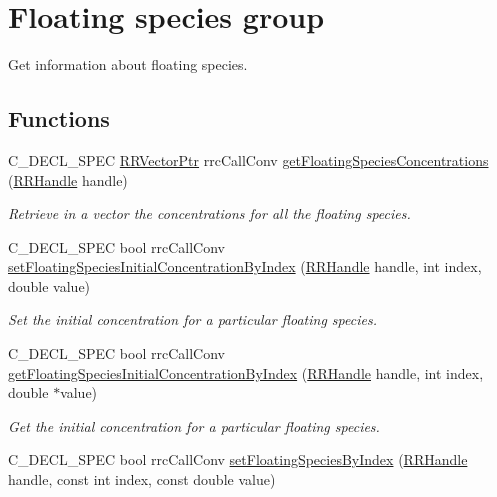 \hypertarget{group__floating}{}\section{Floating species group}
\label{group__floating}


Get information about floating species.  


\subsection*{Functions}
\begin{DoxyCompactItemize}
\item 
C\+\_\+\+D\+E\+C\+L\+\_\+\+S\+P\+E\+C \hyperlink{rrc__types_8h_a3be72d6006034fd349f753d2bf441bf7}{R\+R\+Vector\+Ptr} rrc\+Call\+Conv \hyperlink{group__floating_ga0659eab040dbdfde46b9fc73b46b65d6}{get\+Floating\+Species\+Concentrations} (\hyperlink{rrc__types_8h_a1d68f0592372208fa5a5f2799ea4b3ae}{R\+R\+Handle} handle)
\begin{DoxyCompactList}\small\item\em Retrieve in a vector the concentrations for all the floating species. \end{DoxyCompactList}\item 
C\+\_\+\+D\+E\+C\+L\+\_\+\+S\+P\+E\+C bool rrc\+Call\+Conv \hyperlink{group__floating_ga1a86710f9772e7a7072aa7de264b0c45}{set\+Floating\+Species\+Initial\+Concentration\+By\+Index} (\hyperlink{rrc__types_8h_a1d68f0592372208fa5a5f2799ea4b3ae}{R\+R\+Handle} handle, int index, double value)
\begin{DoxyCompactList}\small\item\em Set the initial concentration for a particular floating species. \end{DoxyCompactList}\item 
C\+\_\+\+D\+E\+C\+L\+\_\+\+S\+P\+E\+C bool rrc\+Call\+Conv \hyperlink{group__floating_ga7dcf8267460ec9fec7559194ed7e7e1d}{get\+Floating\+Species\+Initial\+Concentration\+By\+Index} (\hyperlink{rrc__types_8h_a1d68f0592372208fa5a5f2799ea4b3ae}{R\+R\+Handle} handle, int index, double $\ast$value)
\begin{DoxyCompactList}\small\item\em Get the initial concentration for a particular floating species. \end{DoxyCompactList}\item 
C\+\_\+\+D\+E\+C\+L\+\_\+\+S\+P\+E\+C bool rrc\+Call\+Conv \hyperlink{group__floating_ga892e70470a45d8be4e443c6048064c0e}{set\+Floating\+Species\+By\+Index} (\hyperlink{rrc__types_8h_a1d68f0592372208fa5a5f2799ea4b3ae}{R\+R\+Handle} handle, const int index, const double value)

\end{DoxyCompactItemize}
